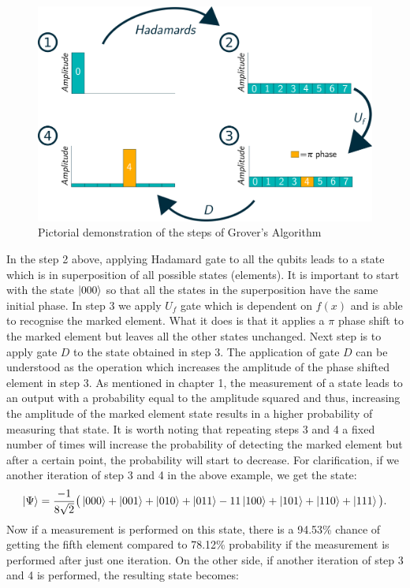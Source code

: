 \begin{figure}
    \centering
    \includegraphics[width=0.9\linewidth]{figures/Grovers.png}
    \caption{Pictorial demonstration of the steps of Grover's Algorithm}
    \label{fig:Grovers}
\end{figure}


In the step 2 above, applying Hadamard gate to all the qubits leads to a state which is in superposition of all possible states (elements). It is important to start with the state $\left\vert{000}\right\rangle$ so that all the states in the superposition have the same initial phase. In step 3 we apply $U_{f}$ gate which is dependent on $f(x)$ and is able to recognise the marked element. What it does is that it applies a $\pi$ phase shift to the marked element but leaves all the other states unchanged. Next step is to apply gate $D$ to the state obtained in step 3. The application of gate $D$ can be understood as the operation which increases the amplitude of the phase shifted element in step 3. As mentioned in chapter 1, the measurement of a state leads to an output with a probability equal to the amplitude squared and thus, increasing the amplitude of the marked element state results in a higher probability of measuring that state. It is worth noting that repeating steps 3 and 4 a fixed number of times will increase the probability of detecting the marked element but after a certain point, the probability will start to decrease. For clarification, if we another iteration of step 3 and 4 in the above example, we get the state:
\begin{align}
\left\vert{\Psi}\right\rangle=\dfrac{-1}{8\sqrt{2}}\big(\left\vert{000}\right\rangle+\left\vert{001}\right\rangle+\left\vert{010}\right\rangle+\left\vert{011}\right\rangle-11\left\vert{100}\right\rangle+\left\vert{101}\right\rangle+\left\vert{110}\right\rangle+\left\vert{111}\right\rangle\big).
\end{align}
 Now if a measurement is performed on this state, there is a 94.53\% chance of getting the fifth element compared to 78.12\% probability if the measurement is performed after just one iteration. On the other side, if another iteration of step 3 and 4 is performed, the resulting state becomes:

